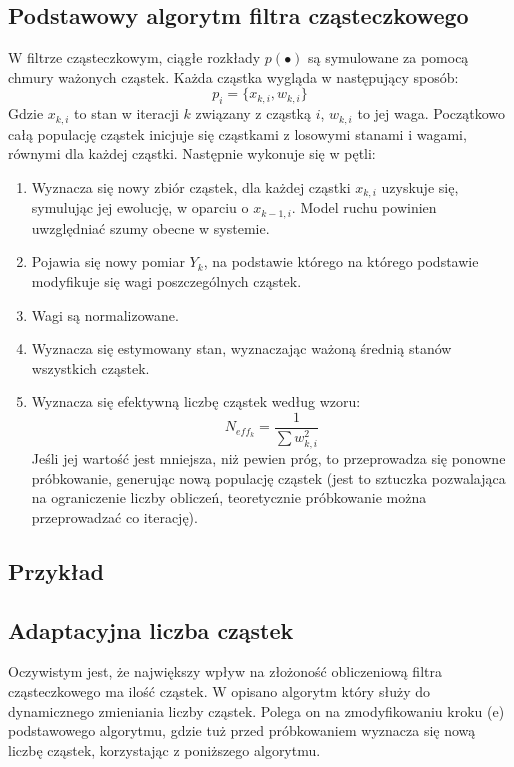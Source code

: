\documentclass[10pt,a4paper]{article}
\begin{document}
\subsection{Podstawowy algorytm filtra cząsteczkowego}
W filtrze cząsteczkowym, ciągłe rozkłady $p(\bullet)$ są symulowane za pomocą chmury ważonych cząstek. Każda cząstka wygląda w następujący sposób:
\begin{equation*}
	p_i=\{x_{k,i},w_{k,i}\}
\end{equation*}
Gdzie $x_{k,i}$ to stan w iteracji $k$ związany z cząstką $i$, $w_{k,i}$ to jej waga.
Początkowo całą populację cząstek inicjuje się cząstkami z losowymi stanami i wagami, równymi dla każdej cząstki. Następnie wykonuje się w pętli:
\begin{enumerate}[label=(\alph*)]
	\item Wyznacza się nowy zbiór cząstek, dla każdej cząstki $x_{k,i}$ uzyskuje się, symulując jej ewolucję, w oparciu o $x_{k-1,i}$. Model ruchu powinien uwzględniać szumy obecne w systemie.
	\item Pojawia się nowy pomiar $Y_k$, na podstawie którego na którego podstawie modyfikuje się wagi poszczególnych cząstek.
	\item Wagi są normalizowane.
	\item Wyznacza się estymowany stan, wyznaczając ważoną średnią stanów wszystkich cząstek.
	\item Wyznacza się efektywną liczbę cząstek według wzoru:
	\begin{equation*}
		N_{eff_k} = \dfrac{1}{\sum w_{k,i}^2}
	\end{equation*}
	Jeśli jej wartość jest mniejsza, niż pewien próg, to przeprowadza się ponowne próbkowanie, generując nową populację cząstek (jest to sztuczka pozwalająca na ograniczenie liczby obliczeń, teoretycznie próbkowanie można przeprowadzać co iterację).
\end{enumerate}

\subsection{Przykład}


\subsection{Adaptacyjna liczba cząstek}
Oczywistym jest, że największy wpływ na złożoność obliczeniową filtra cząsteczkowego ma ilość cząstek. W \cite{adaptive} opisano algorytm który służy do dynamicznego zmieniania liczby cząstek. Polega on na zmodyfikowaniu kroku (e) podstawowego algorytmu, gdzie tuż przed próbkowaniem wyznacza się nową liczbę cząstek, korzystając z poniższego algorytmu.
\end{document}

